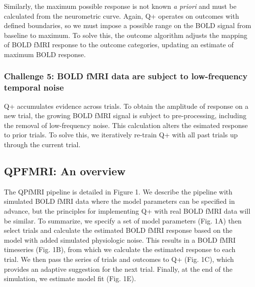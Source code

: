 \documentclass[
  man,floatsintext]{apa6}
\begin{document}
Similarly, the maximum possible response is not known \emph{a priori} and must be calculated from the neurometric curve. Again, Q+ operates on outcomes with defined boundaries, so we must impose a possible range on the BOLD signal from baseline to maximum. To solve this, the outcome algorithm adjusts the mapping of BOLD fMRI response to the outcome categories, updating an estimate of maximum BOLD response.

\hypertarget{challenge-5-bold-fmri-data-are-subject-to-low-frequency-temporal-noise}{%
\subsubsection{Challenge 5: BOLD fMRI data are subject to low-frequency temporal noise}\label{challenge-5-bold-fmri-data-are-subject-to-low-frequency-temporal-noise}}

Q+ accumulates evidence across trials. To obtain the amplitude of response on a new trial, the growing BOLD fMRI signal is subject to pre-processing, including the removal of low-frequency noise. This calculation alters the esimated response to prior trials. To solve this, we iteratively re-train Q+ with all past trials up through the current trial.

\hypertarget{qpfmri-an-overview}{%
\subsection{QPFMRI: An overview}\label{qpfmri-an-overview}}

The QPfMRI pipeline is detailed in Figure 1. We describe the pipeline with simulated BOLD fMRI data where the model parameters can be specified in advance, but the principles for implementing Q+ with real BOLD fMRI data will be similar. To summarize, we specify a set of model parameters (Fig. 1A) then select trials and calculate the estimated BOLD fMRI response based on the model with added simulated physiologic noise. This results in a BOLD fMRI timeseries (Fig. 1B), from which we calculate the estimated response to each trial. We then pass the series of trials and outcomes to Q+ (Fig. 1C), which provides an adaptive suggestion for the next trial. Finally, at the end of the simulation, we estimate model fit (Fig. 1E).
\end{document}
